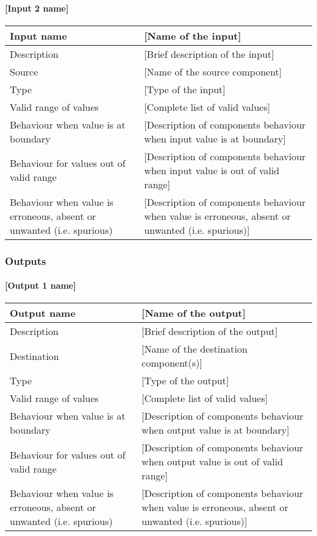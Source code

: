 \paragraph{[Input 2 name]}

\begin{longtable}{p{}p{}}
\toprule
Input name				& [Name of the input] \\
\midrule
Description				& [Brief description of the input] \\
\midrule
Source					& [Name of the source component] \\ 
\midrule
Type					& [Type of the input] \\
\midrule
Valid range of values	& [Complete list of valid values] \\
\midrule
Behaviour when value is at boundary	& [Description of components behaviour when input value is at boundary] \\
\midrule
Behaviour for values out of valid range	& [Description of components behaviour when input value is out of valid range] \\
\midrule
Behaviour when value is erroneous, absent or unwanted (i.e. spurious) & [Description of components behaviour when value is erroneous, absent or unwanted (i.e. spurious)] \\
\bottomrule
\end{longtable}


\subsubsection{Outputs}\label{s:manage_radio_communication_outputs}

\paragraph{[Output 1 name]}

\begin{longtable}{p{}p{}}
\toprule
Output name				& [Name of the output] \\
\midrule
Description				& [Brief description of the output] \\
\midrule
Destination				& [Name of the destination component(s)] \\ 
\midrule
Type					& [Type of the output] \\
\midrule
Valid range of values	& [Complete list of valid values] \\
\midrule
Behaviour when value is at boundary	& [Description of components behaviour when output value is at boundary] \\
\midrule
Behaviour for values out of valid range	& [Description of components behaviour when output value is out of valid range] \\
\midrule
Behaviour when value is erroneous, absent or unwanted (i.e. spurious) & [Description of components behaviour when value is erroneous, absent or unwanted (i.e. spurious)] \\
\bottomrule
\end{longtable}


